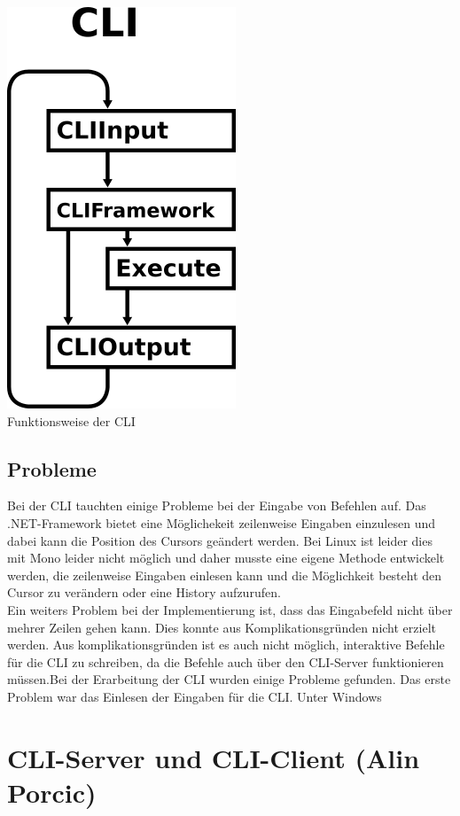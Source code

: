 \documentclass[12pt,a4paper]{report}
\begin{document}
\begin{onehalfspace}
\begin{center}
\includegraphics[scale=2.0]{img/mad_cli.png}\\
Funktionsweise der CLI
\end{center}

\subsection{Probleme}

Bei der CLI tauchten einige Probleme bei der Eingabe von Befehlen auf. Das .NET-Framework bietet eine Möglichekeit zeilenweise Eingaben einzulesen und dabei kann die Position des Cursors geändert werden. Bei Linux ist leider dies mit Mono leider nicht möglich und daher musste eine eigene Methode entwickelt werden, die zeilenweise Eingaben einlesen kann und die Möglichkeit besteht den Cursor zu verändern oder eine History aufzurufen.\\
Ein weiters Problem bei der Implementierung ist, dass das Eingabefeld nicht über mehrer Zeilen gehen kann. Dies konnte aus Komplikationsgründen nicht erzielt werden.
Aus komplikationsgründen ist es auch nicht möglich, interaktive Befehle für die CLI zu schreiben, da die Befehle auch über den CLI-Server funktionieren müssen.Bei der Erarbeitung der CLI wurden einige Probleme gefunden. Das erste Problem war das Einlesen der Eingaben für die CLI. Unter Windows 

\section{CLI-Server und CLI-Client (Alin Porcic)}


\end{onehalfspace}
\end{document}
